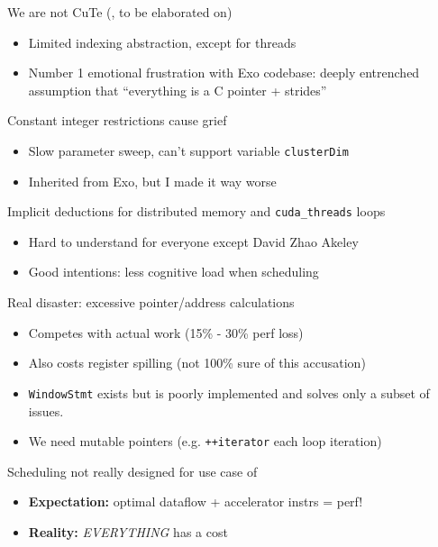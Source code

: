 \newpage
{}

{\LARGE

We are not CuTe (, to be elaborated on)
\begin{itemize}
  \item Limited indexing abstraction, except for threads
  \item Number 1 emotional frustration with Exo codebase: deeply entrenched assumption that ``everything is a C pointer + strides''
\end{itemize}

\vfill

Constant integer restrictions cause grief
\begin{itemize}
  \item Slow parameter sweep, can't support variable \texttt{clusterDim}
  \item Inherited from Exo, but I made it way worse
\end{itemize}

\vfill

Implicit deductions for distributed memory and \texttt{cuda\_threads} loops
\begin{itemize}
  \item Hard to understand for everyone except David Zhao Akeley
  \item Good intentions: less cognitive load when scheduling
\end{itemize}

}

\newpage
{}

{\LARGE

Real disaster: excessive pointer/address calculations
\begin{itemize}
  \item Competes with actual work (15\% - 30\% perf loss)
  \item Also costs register spilling (not 100\% sure of this accusation)
  \item \texttt{WindowStmt} exists but is poorly implemented and solves only a subset of issues.
  \item We need mutable pointers (e.g. \texttt{++iterator} each loop iteration)
\end{itemize}

\vspace{6mm}

Scheduling not really designed for use case of 
\begin{itemize}
  \item \textbf{Expectation:} optimal dataflow + accelerator instrs = perf!
  \item \textbf{Reality:} \textit{EVERYTHING} has a cost
\end{itemize}

}

